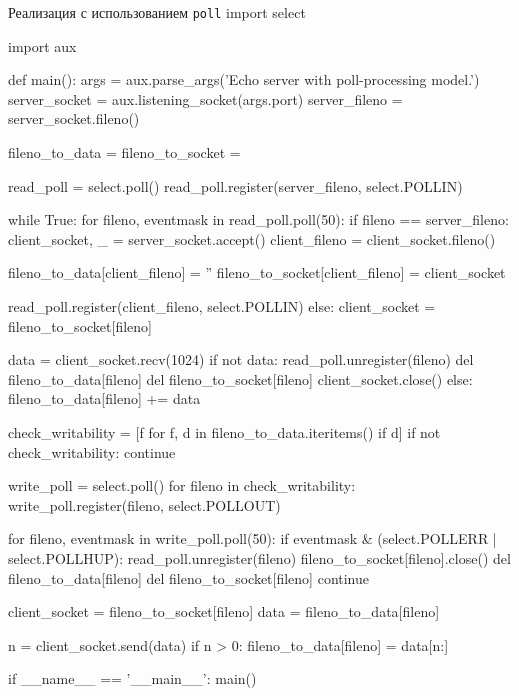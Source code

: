 \begin{pylst}{Реализация с использованием \lstinline{poll}}{}
import select

import aux

def main():
    args = aux.parse_args('Echo server with poll-processing model.')
    server_socket = aux.listening_socket(args.port)
    server_fileno = server_socket.fileno()

    fileno_to_data = {}
    fileno_to_socket = {}

    read_poll = select.poll()
    read_poll.register(server_fileno, select.POLLIN)

    while True:
        for fileno, eventmask in read_poll.poll(50):
            if fileno == server_fileno:
                client_socket, _ = server_socket.accept()
                client_fileno = client_socket.fileno()

                fileno_to_data[client_fileno] = ''
                fileno_to_socket[client_fileno] = client_socket

                read_poll.register(client_fileno, select.POLLIN)
            else:
                client_socket = fileno_to_socket[fileno]

                data = client_socket.recv(1024)
                if not data:
                    read_poll.unregister(fileno)
                    del fileno_to_data[fileno]
                    del fileno_to_socket[fileno]
                    client_socket.close()
                else:
                    fileno_to_data[fileno] += data

        check_writability = [f for f, d in fileno_to_data.iteritems() if d]
        if not check_writability:
            continue

        write_poll = select.poll()
        for fileno in check_writability:
            write_poll.register(fileno, select.POLLOUT)

        for fileno, eventmask in write_poll.poll(50):
            if eventmask & (select.POLLERR | select.POLLHUP):
                read_poll.unregister(fileno)
                fileno_to_socket[fileno].close()
                del fileno_to_data[fileno]
                del fileno_to_socket[fileno]
                continue

            client_socket = fileno_to_socket[fileno]
            data = fileno_to_data[fileno]

            n = client_socket.send(data)
            if n > 0:
                fileno_to_data[fileno] = data[n:]

if __name__ == '__main__':
    main()
\end{pylst}

